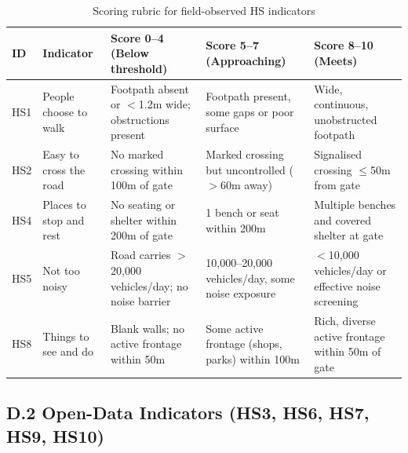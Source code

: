 \documentclass[11pt,a4paper]{article}
\begin{document}
\begin{table}[H]\centering\small
\caption{Scoring rubric for field-observed HS indicators}
\setlength{\tabcolsep}{4pt}
\begin{tabular}{C{0.6cm}L{2.8cm}L{4.2cm}L{4.2cm}L{2.4cm}}
\toprule
\textbf{ID} & \textbf{Indicator} & \textbf{Score 0--4 (Below threshold)} & \textbf{Score 5--7 (Approaching)} & \textbf{Score 8--10 (Meets)} \\
\midrule
HS1 & People choose to walk & Footpath absent or $<$1.2m wide; obstructions present & Footpath present, some gaps or poor surface & Wide, continuous, unobstructed footpath \\
\midrule
HS2 & Easy to cross the road & No marked crossing within 100m of gate & Marked crossing but uncontrolled ($>$60m away) & Signalised crossing $\leq$50m from gate \\
\midrule
HS4 & Places to stop and rest & No seating or shelter within 200m of gate & 1 bench or seat within 200m & Multiple benches and covered shelter at gate \\
\midrule
HS5 & Not too noisy & Road carries $>$20,000 vehicles/day; no noise barrier & 10,000--20,000 vehicles/day, some noise exposure & $<$10,000 vehicles/day or effective noise screening \\
\midrule
HS8 & Things to see and do & Blank walls; no active frontage within 50m & Some active frontage (shops, parks) within 100m & Rich, diverse active frontage within 50m of gate \\
\bottomrule
\end{tabular}
\end{table}

\subsection*{D.2 Open-Data Indicators (HS3, HS6, HS7, HS9, HS10)}
\end{document}
